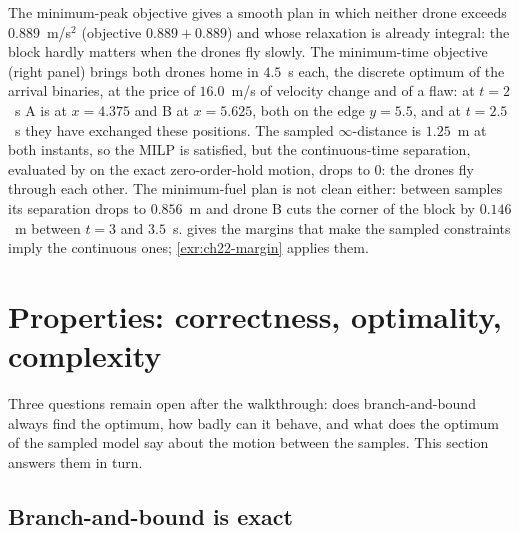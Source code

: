 The minimum-peak objective gives a smooth plan in which neither drone
exceeds $0.889$~m/s$^2$ (objective $0.889 + 0.889$) and whose relaxation is
already integral: the block hardly matters
when the drones fly slowly. The minimum-time objective (right panel) brings
both drones home in $4.5$~s each, the discrete optimum of the arrival
binaries, at the price of $16.0$~m/s of velocity change and of a flaw: at
$t = 2$~s A is at $x = 4.375$ and B at $x = 5.625$, both on the edge
$y = 5.5$, and at $t = 2.5$~s they have exchanged these positions. The
sampled $\infty$-distance is $1.25$~m at both instants, so the MILP is
satisfied, but the continuous-time separation, evaluated by
 on the exact zero-order-hold motion, drops to $0$:
the drones fly through each other. The minimum-fuel plan is not clean
either: between samples its separation drops to $0.856$~m and drone B cuts
the corner of the block by $0.146$~m between $t = 3$ and $3.5$~s.
 gives the margins that make the sampled
constraints imply the continuous ones; \cref{exr:ch22-margin} applies them.


\section{Properties: correctness, optimality, complexity}
\label{sec:ch22-properties}

Three questions remain open after the walkthrough: does branch-and-bound
always find the optimum, how badly can it behave, and what does the
optimum of the sampled model say about the motion between the samples.
This section answers them in turn.

\subsection{Branch-and-bound is exact}

